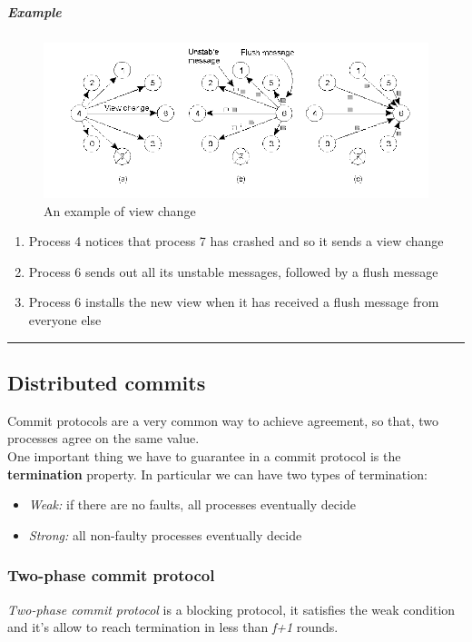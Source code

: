 \subparagraph{Example}
\begin{figure}[htbp]
\centering
\includegraphics{src/images/fault-tolerance/VS.png}
\caption{An example of view change}
\end{figure}

\begin{enumerate}
    \item Process 4 notices that process 7 has crashed and so it sends a view change
    \item Process 6 sends out all its unstable messages, followed by a flush message
    \item Process 6 installs the new view when it has received a flush message from everyone else
\end{enumerate}

\begin{center}\rule{3in}{0.4pt}\end{center}

\subsection{Distributed commits}\label{distributed-commits}
Commit protocols are a very common way to achieve agreement, so that, two processes agree on the same value.\\
One important thing we have to guarantee in a commit protocol is the \textbf{termination} property. In particular we can have two types of termination:
\begin{itemize}
\itemsep1pt\parskip0pt
\item
  \emph{Weak:} if there are no faults, all processes eventually decide
\item
  \emph{Strong:} all non-faulty processes eventually decide
\end{itemize}

\subsubsection{Two-phase commit protocol}\label{two-phase-commit}
\textit{Two-phase commit protocol} is a blocking protocol, it satisfies the weak condition and it's allow to reach termination in less than \emph{f+1} rounds.

